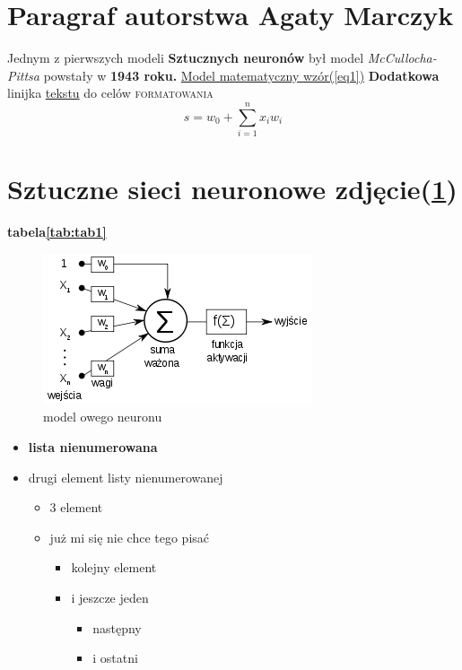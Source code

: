 \section{Paragraf autorstwa Agaty Marczyk}
\begin{flushleft}
    Jednym z pierwszych modeli \textbf{Sztucznych neuronów} był model \textit{McCullocha-Pittsa}
    powstały w \textbf{1943 roku.} \underline{Model matematyczny wzór(\ref{eq1})}
    \textbf{Dodatkowa} linijka \underline{tekstu} do celów \textsc{formatowania}
    \begin{equation} \label{eq1}
        {\displaystyle s=w_{0}+\sum _{i=1}^{n}x_{i}w_{i}}
    \end{equation}
    \setlength{\parindent}{20pt}

    \section*{Sztuczne sieci neuronowe zdjęcie(\ref{fig:Neuron})}
    \textbf{tabela\ref{tab:tab1}} 

     \begin{figure}[ht]
        \centering
        \includegraphics{pictures/300px-Neuron_McCullocha-Pittsa.svg.png}
        \caption{model owego neuronu}
        \label{fig:Neuron}
    \end{figure}
    
  
    

    \begin{itemize}
       \item \textbf{lista nienumerowana} 
       \item drugi element listy nienumerowanej 
       \begin{itemize}
         \item 3 element
         \item już mi się nie chce tego pisać
         \begin{itemize}
           \item kolejny element        
           \item i jeszcze jeden
           \begin{itemize}
             \item następny
             \item i ostatni
           \end{itemize}
         \end{itemize}
       \end{itemize}
     \end{itemize}
     

\end{flushleft}
